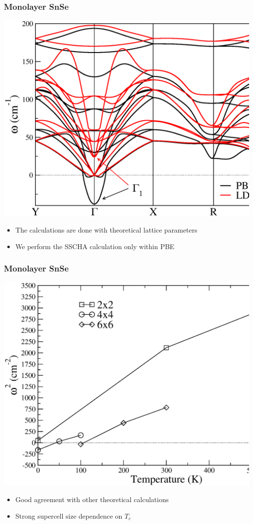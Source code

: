 \documentclass{beamer}
\begin{document}
\begin{frame}

\frametitle{Monolayer SnSe}
\begin{center}
 \includegraphics[width=0.8\linewidth]{Pictures/MonoSnSe/harmonic-mono.eps}
\end{center}
\begin{itemize}
 \item The calculations are done with theoretical lattice parameters
 \item We perform the SSCHA calculation only within PBE
\end{itemize}

\end{frame}


\begin{frame}

\frametitle{Monolayer SnSe}
\begin{center}
 \includegraphics[width=0.75\linewidth]{Pictures/MonoSnSe/freq-mono.eps}
\end{center}
\begin{itemize}
 \item Good agreement with other theoretical calculations
 \item Strong supercell size dependence on $T_{c}$
\end{itemize}

\end{frame}
\end{document}
